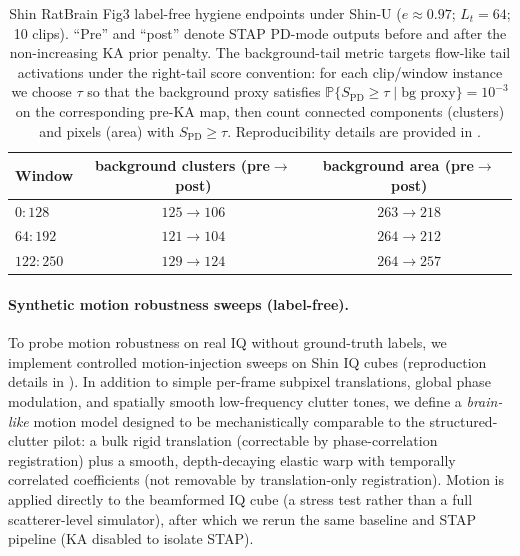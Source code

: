 \begin{table}[t]
\centering
\small
\begin{tabular}{lcc}
\hline
Window & background clusters (pre$\rightarrow$post) & background area (pre$\rightarrow$post) \\
\hline
$0{:}128$ & $125\rightarrow 106$ & $263\rightarrow 218$ \\
$64{:}192$ & $121\rightarrow 104$ & $264\rightarrow 212$ \\
$122{:}250$ & $129\rightarrow 124$ & $264\rightarrow 257$ \\
\hline
\end{tabular}
\caption{Shin RatBrain Fig3 label-free hygiene endpoints under Shin-U ($e\approx 0.97$; $L_t=64$; 10 clips). ``Pre'' and ``post'' denote STAP PD-mode outputs before and after the non-increasing KA prior penalty. The background-tail metric targets flow-like tail activations under the right-tail score convention: for each clip/window instance we choose $\tau$ so that the background proxy satisfies $\mathbb{P}\{S_{\mathrm{PD}}\ge\tau\mid \text{bg proxy}\}=10^{-3}$ on the corresponding pre-KA map, then count connected components (clusters) and pixels (area) with $S_{\mathrm{PD}}\ge\tau$. Reproducibility details are provided in .}
\label{tab:shin_hygiene}
\end{table}

\paragraph{Synthetic motion robustness sweeps (label-free).}
To probe motion robustness on real IQ without ground-truth labels, we implement controlled motion-injection sweeps on Shin IQ cubes (reproduction details in ). In addition to simple per-frame subpixel translations, global phase modulation, and spatially smooth low-frequency clutter tones, we define a \emph{brain-like} motion model designed to be mechanistically comparable to the structured-clutter pilot: a bulk rigid translation (correctable by phase-correlation registration) plus a smooth, depth-decaying elastic warp with temporally correlated coefficients (not removable by translation-only registration). Motion is applied directly to the beamformed IQ cube (a stress test rather than a full scatterer-level simulator), after which we rerun the same baseline and STAP pipeline (KA disabled to isolate STAP).

